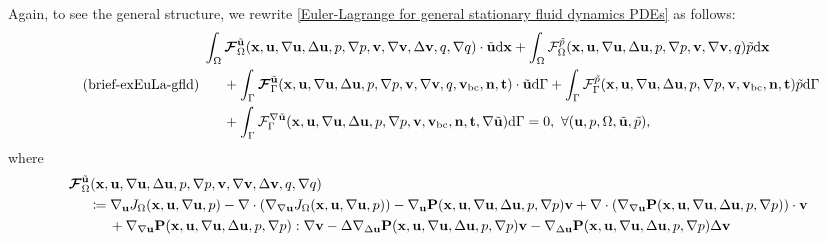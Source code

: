 \documentclass[oneside]{book}
\numberwithin{equation}{section}
\begin{document}
\begin{itemize}[leftmargin=0in]
    Again, to see the general structure, we rewrite \eqref{Euler-Lagrange for general stationary fluid dynamics PDEs} as follows:
    \begin{equation}
        \label{brief extended Euler-Lagrange for general stationary fluid dynamics PDEs}
        \tag{brief-exEuLa-gfld}
        \left.\begin{split}
            &\int_\Omega \boldsymbol{\mathcal{F}}_\Omega^{\tilde{\bf u}}({\bf x},{\bf u},\nabla{\bf u},\Delta{\bf u},p,\nabla p,{\bf v},\nabla{\bf v},\Delta{\bf v},q,\nabla q)\cdot\tilde{\bf u}{\rm d}{\bf x} + \int_\Omega \mathcal{F}_\Omega^{\tilde{p}}({\bf x},{\bf u},\nabla{\bf u},\Delta{\bf u},p,\nabla p,{\bf v},\nabla{\bf v},q)\tilde{p}{\rm d}{\bf x}\\
            &\hspace{5mm}+ \int_\Gamma \boldsymbol{\mathcal{F}}_\Gamma^{\tilde{\bf u}}({\bf x},{\bf u},\nabla{\bf u},\Delta{\bf u},p,\nabla p,{\bf v},\nabla{\bf v},q,{\bf v}_{\rm bc},{\bf n},{\bf t})\cdot\tilde{\bf u}{\rm d}\Gamma + \int_\Gamma \mathcal{F}_\Gamma^{\tilde{p}}({\bf x},{\bf u},\nabla{\bf u},\Delta{\bf u},p,\nabla p,{\bf v},{\bf v}_{\rm bc},{\bf n},{\bf t})\tilde{p}{\rm d}\Gamma\\
            &\hspace{5mm}+ \int_\Gamma \mathcal{F}_\Gamma^{\nabla\tilde{\bf u}}({\bf x},{\bf u},\nabla{\bf u},\Delta{\bf u},p,\nabla p,{\bf v},{\bf v}_{\rm bc},{\bf n},{\bf t},\nabla\tilde{\bf u}){\rm d}\Gamma = 0,\ \forall({\bf u},p,\Omega,\tilde{\bf u},\tilde{p}),
        \end{split}\right.
    \end{equation}
    where
    \begin{align*}
        &\boldsymbol{\mathcal{F}}_\Omega^{\tilde{\bf u}}({\bf x},{\bf u},\nabla{\bf u},\Delta{\bf u},p,\nabla p,{\bf v},\nabla{\bf v},\Delta{\bf v},q,\nabla q)\\
        &\hspace{5mm}\coloneqq\nabla_{\bf u}J_\Omega({\bf x},{\bf u},\nabla{\bf u},p) - \nabla\cdot\left(\nabla_{\nabla{\bf u}}J_\Omega({\bf x},{\bf u},\nabla{\bf u},p)\right) - \nabla_{\bf u}{\bf P}({\bf x},{\bf u},\nabla{\bf u},\Delta{\bf u},p,\nabla p){\bf v} + \nabla\cdot\left(\nabla_{\nabla{\bf u}}{\bf P}({\bf x},{\bf u},\nabla{\bf u},\Delta{\bf u},p,\nabla p)\right)\cdot{\bf v}\\
        &\hspace{1cm}+ \nabla_{\nabla{\bf u}}{\bf P}({\bf x},{\bf u},\nabla{\bf u},\Delta{\bf u},p,\nabla p):\nabla{\bf v} - \Delta\nabla_{\Delta{\bf u}}{\bf P}({\bf x},{\bf u},\nabla{\bf u},\Delta{\bf u},p,\nabla p){\bf v} - \nabla_{\Delta{\bf u}}{\bf P}({\bf x},{\bf u},\nabla{\bf u},\Delta{\bf u},p,\nabla p)\Delta{\bf v}\\

\end{align*}
\end{itemize}
\end{document}
